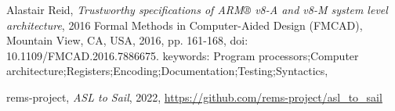 \begin{thebibliography}{00}
 Alastair Reid, \textit{Trustworthy specifications of ARM® v8-A and v8-M system level architecture}, 2016 Formal Methods in Computer-Aided Design (FMCAD), Mountain View, CA, USA, 2016, pp. 161-168, doi: 10.1109/FMCAD.2016.7886675. keywords: {Program processors;Computer architecture;Registers;Encoding;Documentation;Testing;Syntactics},

 rems-project, \textit{ASL to Sail}, 2022, \url{https://github.com/rems-project/asl_to_sail}




\end{thebibliography}
